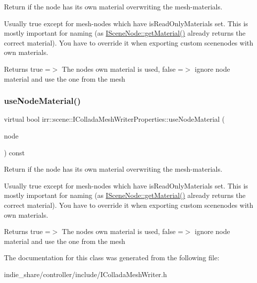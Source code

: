 Return if the node has it\textquotesingle{}s own material overwriting the mesh-\/materials. 

Usually true except for mesh-\/nodes which have is\+Read\+Only\+Materials set. This is mostly important for naming (as \hyperlink{classirr_1_1scene_1_1ISceneNode_a1f44d8cf753b2e4c17c90d4fc2ed05b2}{I\+Scene\+Node\+::get\+Material()} already returns the correct material). You have to override it when exporting custom scenenodes with own materials. \begin{DoxyReturn}{Returns}
true =$>$ The node\textquotesingle{}s own material is used, false =$>$ ignore node material and use the one from the mesh 
\end{DoxyReturn}
\mbox{\label{classirr_1_1scene_1_1IColladaMeshWriterProperties_a9c10df4dc3602efbba6a47b34e2f8f4b}} 
\subsubsection{\texorpdfstring{use\+Node\+Material()}{useNodeMaterial()}\hspace{0.1cm}{\footnotesize\ttfamily [2/2]}}
{\footnotesize\ttfamily virtual bool irr\+::scene\+::\+I\+Collada\+Mesh\+Writer\+Properties\+::use\+Node\+Material (\begin{DoxyParamCaption}\item[{const \hyperlink{classirr_1_1scene_1_1ISceneNode}{scene\+::\+I\+Scene\+Node} $\ast$}]{node }\end{DoxyParamCaption}) const\hspace{0.3cm}{\ttfamily [pure virtual]}}



Return if the node has it\textquotesingle{}s own material overwriting the mesh-\/materials. 

Usually true except for mesh-\/nodes which have is\+Read\+Only\+Materials set. This is mostly important for naming (as \hyperlink{classirr_1_1scene_1_1ISceneNode_a1f44d8cf753b2e4c17c90d4fc2ed05b2}{I\+Scene\+Node\+::get\+Material()} already returns the correct material). You have to override it when exporting custom scenenodes with own materials. \begin{DoxyReturn}{Returns}
true =$>$ The node\textquotesingle{}s own material is used, false =$>$ ignore node material and use the one from the mesh 
\end{DoxyReturn}


The documentation for this class was generated from the following file\+:\begin{DoxyCompactItemize}
\item 
indie\+\_\+share/controller/include/I\+Collada\+Mesh\+Writer.\+h\end{DoxyCompactItemize}
